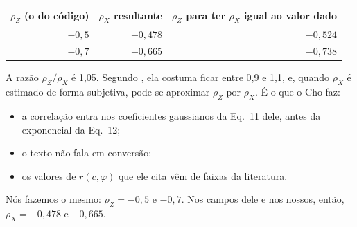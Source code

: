 \documentclass[11pt,a4paper]{article}
\begin{document}
\begin{center}\small
\begin{tabular}{rrr}
\toprule
$\rho_Z$ (o do código) & $\rho_X$ resultante & $\rho_Z$ para ter $\rho_X$ igual ao valor dado \\
\midrule
$-0{,}5$ & $-0{,}478$ & $-0{,}524$ \\
$-0{,}7$ & $-0{,}665$ & $-0{,}738$ \\
\bottomrule
\end{tabular}
\end{center}
A razão $\rho_Z/\rho_X$ é 1,05. Segundo \citet[p.~126]{beck2014}, ela costuma ficar entre 0,9 e 1,1, e, quando
$\rho_X$ é estimado de forma subjetiva, pode-se aproximar $\rho_Z$ por $\rho_X$. É o que o Cho faz:
\begin{itemize}
  \item a correlação entra nos coeficientes gaussianos da Eq.~11 dele, antes da exponencial da Eq.~12;
  \item o texto não fala em conversão;
  \item os valores de $r(c, \varphi)$ que ele cita vêm de faixas da literatura.
\end{itemize}
Nós fazemos o mesmo: $\rho_Z = -0{,}5$ e $-0{,}7$. Nos campos dele e nos nossos, então, $\rho_X = -0{,}478$ e
$-0{,}665$.
\end{document}
